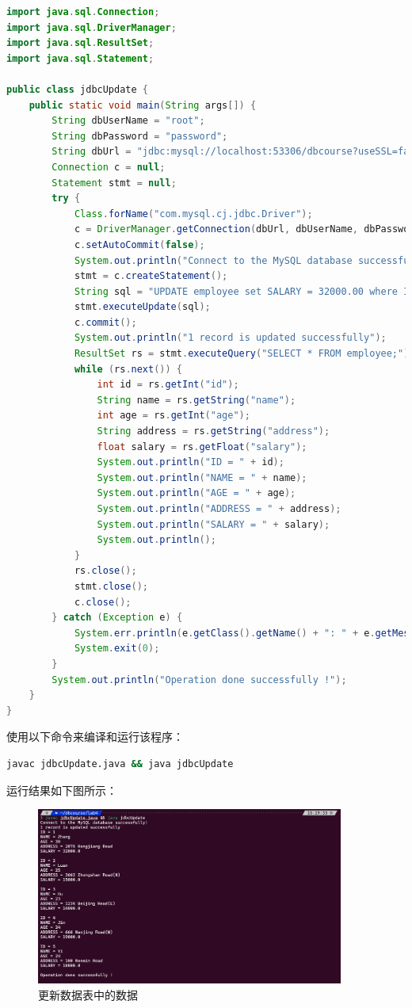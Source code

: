 \documentclass{article}
\begin{document}
\begin{lstlisting}[language=java]
import java.sql.Connection;
import java.sql.DriverManager;
import java.sql.ResultSet;
import java.sql.Statement;

public class jdbcUpdate {
    public static void main(String args[]) {
        String dbUserName = "root";
        String dbPassword = "password";
        String dbUrl = "jdbc:mysql://localhost:53306/dbcourse?useSSL=false&allowPublicKeyRetrieval=true";
        Connection c = null;
        Statement stmt = null;
        try {
            Class.forName("com.mysql.cj.jdbc.Driver");
            c = DriverManager.getConnection(dbUrl, dbUserName, dbPassword);
            c.setAutoCommit(false);
            System.out.println("Connect to the MySQL database successfully!");
            stmt = c.createStatement();
            String sql = "UPDATE employee set SALARY = 32000.00 where ID = 1;";
            stmt.executeUpdate(sql);
            c.commit();
            System.out.println("1 record is updated successfully");
            ResultSet rs = stmt.executeQuery("SELECT * FROM employee;");
            while (rs.next()) {
                int id = rs.getInt("id");
                String name = rs.getString("name");
                int age = rs.getInt("age");
                String address = rs.getString("address");
                float salary = rs.getFloat("salary");
                System.out.println("ID = " + id);
                System.out.println("NAME = " + name);
                System.out.println("AGE = " + age);
                System.out.println("ADDRESS = " + address);
                System.out.println("SALARY = " + salary);
                System.out.println();
            }
            rs.close();
            stmt.close();
            c.close();
        } catch (Exception e) {
            System.err.println(e.getClass().getName() + ": " + e.getMessage());
            System.exit(0);
        }
        System.out.println("Operation done successfully !");
    }
}
\end{lstlisting}

使用以下命令来编译和运行该程序：

\begin{lstlisting}[language=bash]
javac jdbcUpdate.java && java jdbcUpdate
\end{lstlisting}

运行结果如下图所示：

\begin{figure}[H]
  \centering
  \includegraphics[width=0.9\textwidth]{img/9.png}
  \caption{更新数据表中的数据}
\end{figure}
\end{document}
